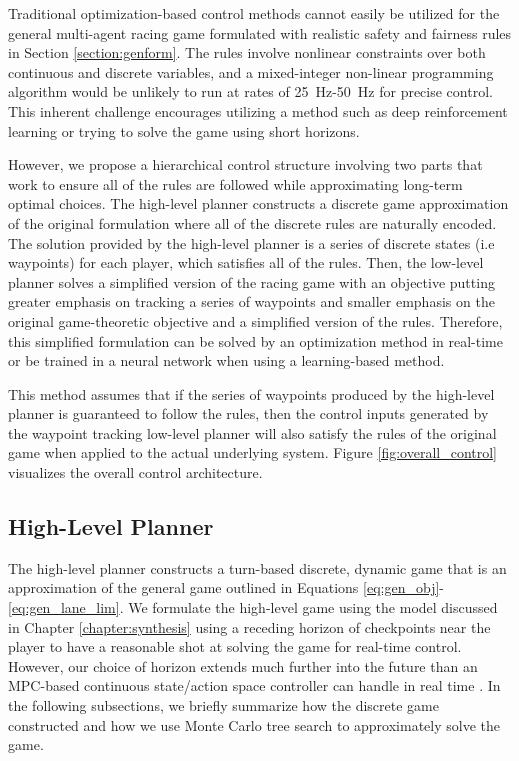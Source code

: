 Traditional optimization-based control methods cannot easily be utilized for the general multi-agent racing game formulated with realistic safety and fairness rules in Section \ref{section:genform}. The rules involve nonlinear constraints over both continuous and discrete variables, and a mixed-integer non-linear programming algorithm would be unlikely to run at rates of \SI{25}{\hertz}-\SI{50}{\hertz} for precise control. This inherent challenge encourages utilizing a method such as deep reinforcement learning or trying to solve the game using short horizons. 

However, we propose a hierarchical control structure involving two parts that work to ensure all of the rules are followed while approximating long-term optimal choices. The high-level planner constructs a discrete game approximation of the original formulation where all of the discrete rules are naturally encoded. The solution provided by the high-level planner is a series of discrete states (i.e waypoints) for each player, which satisfies all of the rules. Then, the low-level planner solves a simplified version of the racing game with an objective putting greater emphasis on tracking a series of waypoints and smaller emphasis on the original game-theoretic objective and a simplified version of the rules. Therefore, this simplified formulation can be solved by an optimization method in real-time or be trained in a neural network when using a learning-based method. 

This method assumes that if the series of waypoints produced by the high-level planner is guaranteed to follow the rules, then the control inputs generated by the waypoint tracking low-level planner will also satisfy the rules of the original game when applied to the actual underlying system. Figure \ref{fig:overall_control} visualizes the overall control architecture.

\subsection{High-Level Planner}
The high-level planner constructs a turn-based discrete, dynamic game that is an approximation of the general game outlined in Equations \eqref{eq:gen_obj}-\eqref{eq:gen_lane_lim}. We formulate the high-level game using the model discussed in Chapter \ref{chapter:synthesis} using a receding horizon of checkpoints near the player to have a reasonable shot at solving the game for real-time control. However, our choice of horizon extends much further into the future than an MPC-based continuous state/action space controller can handle in real time \cite{Wang2019}. In the following subsections, we briefly summarize how the discrete game constructed and how we use Monte Carlo tree search to approximately solve the game.

